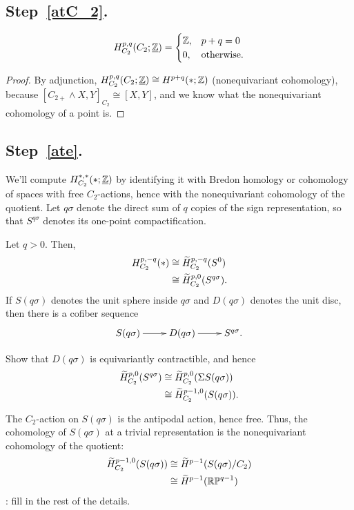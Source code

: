 \subsection*{Step~\ref{atC_2}.}
\begin{lem}
\[H_{C_2}^{p,q}(C_2; \underline{\mathbb Z}) = \begin{cases}
	\mathbb Z, &p+q=0\\
	0, &\text{\rm otherwise.}
\end{cases}\]
\end{lem}
\begin{proof}
By adjunction, $H_{C_2}^{p,q}(C_2;\underline{\mathbb Z})\cong H^{p+q}(*;\mathbb Z)$ (nonequivariant cohomology), because
$[C_{2+}\wedge X, Y]_{C_2}\cong [X,Y]$, and we know what the nonequivariant cohomology of a point is.
\end{proof}
\subsection*{Step~\ref{ate}.}
We'll compute $H_{C_2}^{*,*}(*;\underline{\mathbb Z})$ by identifying it with Bredon homology or cohomology of spaces with
free $C_2$-actions, hence with the nonequivariant cohomology of the quotient. Let $q\sigma$ denote the direct sum
of $q$ copies of the sign representation, so that $S^{q\sigma}$ denotes its one-point
compactification.


Let $q > 0$. Then,
\begin{align*}
	H_{C_2}^{p,-q}(*) &\cong \widetilde H_{C_2}^{p,-q}(S^0)\\
	&\cong \widetilde H_{C_2}^{p,0}(S^{q\sigma}).
\end{align*}
If $S(q\sigma)$ denotes the unit sphere inside $q\sigma$ and $D(q\sigma)$ denotes the unit disc, then there
is a cofiber sequence
\begin{equation}
\label{signed_cofiber}
\xymatrix{
	S(q\sigma)\ar[r] & D(q\sigma)\ar[r] & S^{q\sigma}.
}
\end{equation}
\begin{ex}
Show that $D(q\sigma)$ is equivariantly contractible, and hence
\begin{align*}
	\widetilde H_{C_2}^{p,0}(S^{q\sigma}) &\cong\widetilde H_{C_2}^{p,0}(\Sigma S(q\sigma))\\
	&\cong\widetilde H_{C_2}^{p-1,0}(S(q\sigma)).
\end{align*}
\end{ex}
The $C_2$-action on $S(q\sigma)$ is the antipodal action, hence free. Thus, the cohomology of $S(q\sigma)$ at a
trivial representation is the nonequivariant cohomology of the quotient:
\begin{align*}
	\wH_{C_2}^{p-1,0}(S(q\sigma)) &\cong\wH^{p-1}(S(q\sigma)/C_2)\\
	&\cong \wH^{p-1}(\RP^{q-1}) %
\end{align*}
\TODO: fill in the rest of the details.


